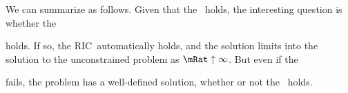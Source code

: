 \documentclass[./BufferStockTheory.tex]{subfiles}
\begin{document}
\begin{comment}
We can obtain a more exact approximation to the correct ${n}$ by defining
\begin{eqnarray}
\nabla(n) \equiv   \lim_{n \rightarrow \infty}\Rnorm^{n}\mathbb{C}_{t-n}^{t}-\Rnorm^{n}\mathbb{C}_{t-n}^{t} & = &  \left(\frac{\PatR^{-n}}{1-\PatR}\right).
\end{eqnarray}
from which we can obtain the difference between the approximate and the exact $\mathbb{C}_{t-n}^{t}$ as $\Rnorm^{-n}\nabla(n)$ and


For this $n$ and
$\bRat$ we can obtain the corresponding
$\cRat=\PatPGro^{-\nFunc(\bRat)}$.  Note, however, that this is {\it not}
the level of $\cRat$ directly associated with $\bRat$ on the true
consumption function, because we used only a limiting approximation to
the correct $n$ rather than the correct $n$.

Our strategy, in this case, is

The limiting difference can be obtained by realizing that
\begin{eqnarray}
\nabla(n) \equiv   \lim_{n \rightarrow \infty}\Rnorm^{n}\mathbb{C}_{t-n}^{t}-\Rnorm^{n}\mathbb{C}_{t-n}^{t} & = &  \left(\frac{\PatR^{-n}}{1-\PatR}\right).
\end{eqnarray}
and so

\end{comment}

We can summarize as follows.  Given that the \GICRaw~holds, the
interesting question is whether the \FHWC~







holds.  If so, the
RIC~automatically holds, and the solution limits
into the solution to the unconstrained problem as $\mRat \uparrow
\infty$.  But even if the \FHWC~







fails, the problem has a
well-defined solution, whether or not the \RIC~holds.

\end{document}
